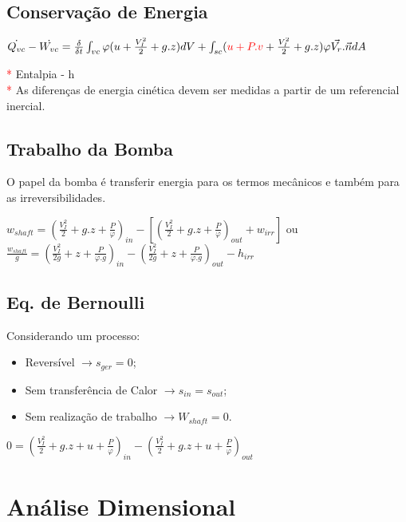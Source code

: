 \documentclass[a4paper, 12pt]{article}
\begin{document}
\subsection{Conservação de Energia}
	\begin{center}
		\Large
		$
		\dot{Q_{vc}} - \dot{W_{vc}} = \frac{\delta}{\delta t} \int_{vc} \varphi (u + \frac{V_I^2}{2} + g.z)dV+ \int_{sc}(\textcolor{red}{u + P.v} + \frac{V_I^2}{2}+g.z)\varphi \vec{V_r}.\vec{n}dA
		$
	\end{center}
	\textcolor{red}{*} Entalpia - h\\
	\textcolor{red}{*} As diferenças de energia cinética devem ser medidas a partir de um referencial inercial.
	
\subsection{Trabalho da Bomba}
	O papel da bomba é transferir energia para os termos mecânicos e também para as irreversibilidades.
	\begin{center}
		\Large
		$
		w_{shaft} = (\frac{V_I^2}{2} + g.z + \frac{P}{\varphi})_{in} - [(\frac{V_I^2}{2} + g.z + \frac{P}{\varphi} )_{out} + w_{irr}]
		$ ou\\
		$
		\frac{w_{shaft}}{g} = (\frac{V_I^2}{2g} + z + \frac{P}{\varphi .g})_{in} - (\frac{V_I^2}{2g} + z + \frac{P}{\varphi .g} )_{out} - h_{irr}
		$
	\end{center}

\subsection{Eq. de Bernoulli}
	Considerando um processo:
	\begin{itemize}
		\item Reversível $\longrightarrow s_{ger} = 0$;
		\item Sem transferência de Calor $\longrightarrow s_{in} = s_{out}$;
		\item Sem realização de trabalho $\longrightarrow W_{shaft} = 0$.
	\end{itemize}

	\begin{center}
		\Large
		$
		0 = (\frac{V_I^2}{2} + g.z + u + \frac{P}{\varphi})_{in} - (\frac{V_I^2}{2} + g.z + u + \frac{P}{\varphi} )_{out}
		$
	\end{center}

\section{Análise Dimensional}
\end{document}
